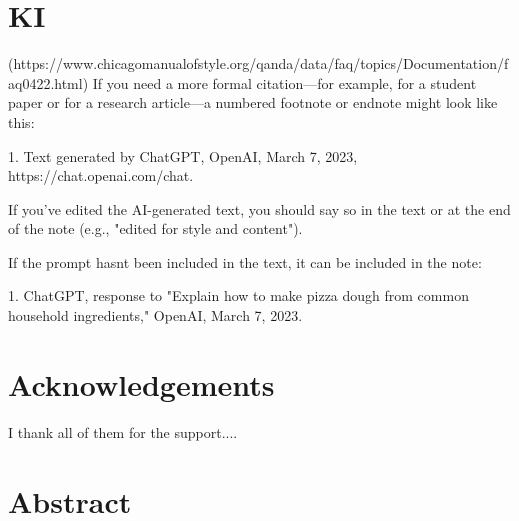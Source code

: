 \documentclass[a4paper, 11pt]{article}
\begin{document}

\clearpage
\pagestyle{plain}

\newpage

\section*{KI}
 (https://www.chicagomanualofstyle.org/qanda/data/faq/topics/Documentation/faq0422.html)
If you need a more formal citation—for example, for a student paper or for a research article—a numbered footnote or endnote might look like this:

1. Text generated by ChatGPT, OpenAI, March 7, 2023, https://chat.openai.com/chat.

If you've edited the AI-generated text, you should say so in the text or at the end of the note (e.g., "edited for style and content").

If the prompt hasnt been included in the text, it can be included in the note:

1. ChatGPT, response to "Explain how to make pizza dough from common household ingredients," OpenAI, March 7, 2023.


\newpage

\section*{Acknowledgements}
I thank all of them for the support....



\newpage
\section*{Abstract}
\end{document}

